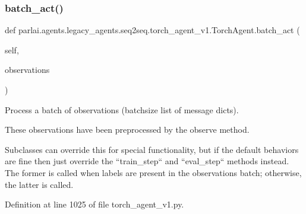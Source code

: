 \mbox{\label{classparlai_1_1agents_1_1legacy__agents_1_1seq2seq_1_1torch__agent__v1_1_1TorchAgent_af3929c1bedc50a48dcf8d1184321f4f5}} 
\subsubsection{\texorpdfstring{batch\+\_\+act()}{batch\_act()}}
{\footnotesize\ttfamily def parlai.\+agents.\+legacy\+\_\+agents.\+seq2seq.\+torch\+\_\+agent\+\_\+v1.\+Torch\+Agent.\+batch\+\_\+act (\begin{DoxyParamCaption}\item[{}]{self,  }\item[{}]{observations }\end{DoxyParamCaption})}

\begin{DoxyVerb}Process a batch of observations (batchsize list of message dicts).

These observations have been preprocessed by the observe method.

Subclasses can override this for special functionality, but if the
default behaviors are fine then just override the ``train_step`` and
``eval_step`` methods instead. The former is called when labels are
present in the observations batch; otherwise, the latter is called.
\end{DoxyVerb}
 

Definition at line 1025 of file torch\+\_\+agent\+\_\+v1.\+py.


